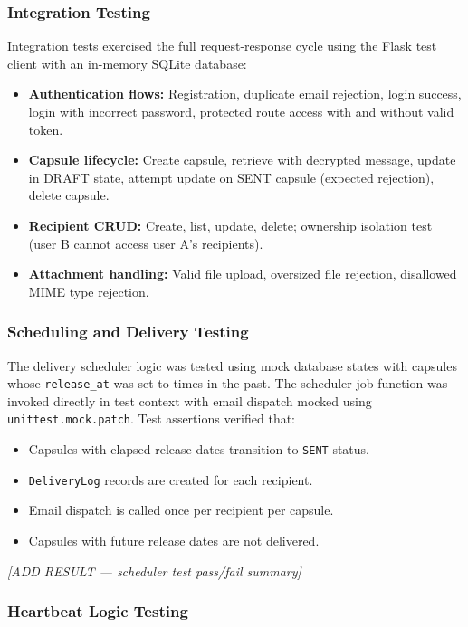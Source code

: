 \documentclass[12pt, a4paper]{article}
\begin{document}
\subsubsection{Integration Testing}

Integration tests exercised the full request-response cycle using the Flask test client with an in-memory SQLite database:

\begin{itemize}
  \item \textbf{Authentication flows:} Registration, duplicate email rejection, login success, login with incorrect password, protected route access with and without valid token.
  \item \textbf{Capsule lifecycle:} Create capsule, retrieve with decrypted message, update in DRAFT state, attempt update on SENT capsule (expected rejection), delete capsule.
  \item \textbf{Recipient CRUD:} Create, list, update, delete; ownership isolation test (user B cannot access user A's recipients).
  \item \textbf{Attachment handling:} Valid file upload, oversized file rejection, disallowed MIME type rejection.
\end{itemize}

\subsubsection{Scheduling and Delivery Testing}

The delivery scheduler logic was tested using mock database states with capsules whose \texttt{release\_at} was set to times in the past. The scheduler job function was invoked directly in test context with email dispatch mocked using \texttt{unittest.mock.patch}. Test assertions verified that:

\begin{itemize}
  \item Capsules with elapsed release dates transition to \texttt{SENT} status.
  \item \texttt{DeliveryLog} records are created for each recipient.
  \item Email dispatch is called once per recipient per capsule.
  \item Capsules with future release dates are not delivered.
\end{itemize}

\textit{[ADD RESULT — scheduler test pass/fail summary]}

\subsubsection{Heartbeat Logic Testing}
\end{document}
